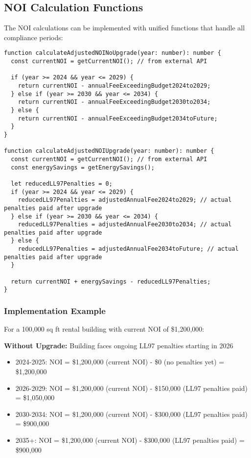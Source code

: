 \documentclass{article}
\begin{document}
\subsection{NOI Calculation Functions}

The NOI calculations can be implemented with unified functions that handle all compliance periods:

\begin{lstlisting}
function calculateAdjustedNOINoUpgrade(year: number): number {
  const currentNOI = getCurrentNOI(); // from external API
  
  if (year >= 2024 && year <= 2029) {
    return currentNOI - annualFeeExceedingBudget2024to2029;
  } else if (year >= 2030 && year <= 2034) {
    return currentNOI - annualFeeExceedingBudget2030to2034;
  } else {
    return currentNOI - annualFeeExceedingBudget2034toFuture;
  }
}

function calculateAdjustedNOIUpgrade(year: number): number {
  const currentNOI = getCurrentNOI(); // from external API
  const energySavings = getEnergySavings();
  
  let reducedLL97Penalties = 0;
  if (year >= 2024 && year <= 2029) {
    reducedLL97Penalties = adjustedAnnualFee2024to2029; // actual penalties paid after upgrade
  } else if (year >= 2030 && year <= 2034) {
    reducedLL97Penalties = adjustedAnnualFee2030to2034; // actual penalties paid after upgrade  
  } else {
    reducedLL97Penalties = adjustedAnnualFee2034toFuture; // actual penalties paid after upgrade
  }
  
  return currentNOI + energySavings - reducedLL97Penalties;
}
\end{lstlisting}

\subsubsection{Implementation Example}

For a 100,000 sq ft rental building with current NOI of \$1,200,000:

\textbf{Without Upgrade:} Building faces ongoing LL97 penalties starting in 2026
\begin{itemize}
    \item 2024-2025: NOI = \$1,200,000 (current NOI) - \$0 (no penalties yet) = \$1,200,000
    \item 2026-2029: NOI = \$1,200,000 (current NOI) - \$150,000 (LL97 penalties paid) = \$1,050,000
    \item 2030-2034: NOI = \$1,200,000 (current NOI) - \$300,000 (LL97 penalties paid) = \$900,000
    \item 2035+: NOI = \$1,200,000 (current NOI) - \$300,000 (LL97 penalties paid) = \$900,000
\end{itemize}
\end{document}
